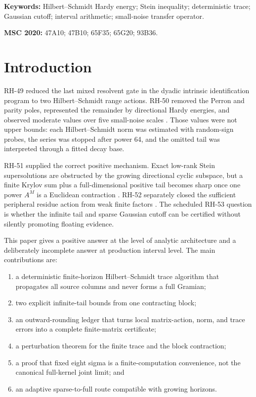 \documentclass[11pt]{article}
\theoremstyle{remark}
\begin{document}
\noindent\textbf{Keywords:} Hilbert--Schmidt Hardy energy; Stein inequality;
deterministic trace; Gaussian cutoff; interval arithmetic; small-noise
transfer operator.

\medskip
\noindent\textbf{MSC 2020:} 47A10; 47B10; 65F35; 65G20; 93B36.

\section{Introduction}

RH-49 reduced the last mixed resolvent gate in the dyadic intrinsic
identification program to two Hilbert--Schmidt range actions.  RH-50 removed
the Perron and parity poles, represented the remainder by directional Hardy
energies, and observed moderate values over five small-noise scales
\citep{WangHardy2026}.  Those values were not upper bounds: each
Hilbert--Schmidt norm was estimated with random-sign probes, the series was
stopped after power 64, and the omitted tail was interpreted through a fitted
decay base.

RH-51 supplied the correct positive mechanism.  Exact low-rank Stein
supersolutions are obstructed by the growing directional cyclic subspace, but
a finite Krylov sum plus a full-dimensional positive tail becomes sharp once
one power \(A^M\) is a Euclidean contraction
\citep{WangStructuredStein2026}.  RH-52 separately closed the sufficient
peripheral residue action from weak finite factors
\citep{WangFactorTransfer2026}.  The scheduled RH-53 question is whether the
infinite tail and sparse Gaussian cutoff can be certified without silently
promoting floating evidence.

This paper gives a positive answer at the level of analytic architecture and
a deliberately incomplete answer at production interval level.  The main
contributions are:
\begin{enumerate}[leftmargin=2em]
 \item a deterministic finite-horizon Hilbert--Schmidt trace algorithm that
       propagates all source columns and never forms a full Gramian;
 \item two explicit infinite-tail bounds from one contracting block;
 \item an outward-rounding ledger that turns local matrix-action, norm, and
       trace errors into a complete finite-matrix certificate;
 \item a perturbation theorem for the finite trace and the block contraction;
 \item a proof that fixed eight sigma is a finite-computation convenience,
       not the canonical full-kernel joint limit; and
 \item an adaptive sparse-to-full route compatible with growing horizons.
\end{enumerate}
\end{document}
